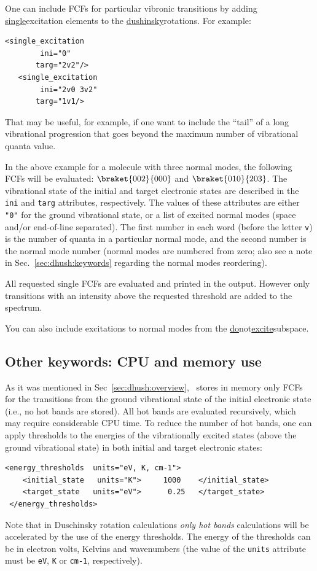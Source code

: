 \documentclass[11pt]{article}
\begin{document}
One can include FCFs for particular vibronic transitions by adding
\ul{single}{excitation} elements to the \ul{dushinsky}{rotations}.
For example:
\begin{lstlisting}[frame=single,framerule=0pt]
   <single_excitation
        ini="0" 
       targ="2v2"/>
   <single_excitation 
        ini="2v0 3v2"  
       targ="1v1/>
\end{lstlisting}
That may be useful, for example, if one want to include the ``tail'' of a long vibrational progression 
that goes beyond the maximum number of vibrational quanta value.

In the above example for a molecule with three normal modes, 
the following FCFs will be evaluated: $\braket{002}{000}$ and $\braket{010}{203}$.
The vibrational state of the initial and target electronic states are
described in the {\tt ini} and {\tt targ} attributes, respectively.
The values of these attributes are either {\tt "0"} for the ground vibrational state, 
or a list of excited normal modes (space and/or end-of-line separated).
The first number in each word (before the letter {\tt v}) is the number of quanta in a particular normal mode,
and the second number is the normal mode number 
(normal modes are numbered from zero; also see a note in Sec.~\ref{sec:dhush:keywords} regarding the normal modes reordering).

All requested single FCFs are evaluated and printed in the output. 
However only transitions with an intensity above the requested threshold are added to the spectrum.

You can also include excitations to normal modes from the \ul{do}{not}\ul{excite}{subspace}.



\subsection{Other keywords: CPU and memory use}

As it was mentioned in Sec~\ref{sec:dhush:overview}, \ezFCF\ stores in memory only FCFs 
for the transitions from the ground vibrational state of the initial electronic state (i.e., no hot bands are stored).
All hot bands are evaluated recursively, which may require considerable CPU time. 
To reduce the number of hot bands, one can apply thresholds
to the energies of the vibrationally excited states 
(above the ground vibrational state) in both initial and target electronic states:
\begin{lstlisting}[frame=single,framerule=0pt]
 <energy_thresholds  units="eV, K, cm-1">
    <initial_state   units="K">     1000    </initial_state>
    <target_state   units="eV">      0.25   </target_state>
 </energy_thresholds>
\end{lstlisting}
Note that in Duschinsky rotation calculations {\em only hot bands} calculations 
will be accelerated by the use of the energy thresholds.
The energy of the thresholds can be in electron volts, Kelvins and wavenumbers 
(the value of the {\tt units} attribute must be {\tt eV}, {\tt K} or {\tt cm-1}, respectively).
\end{document}
